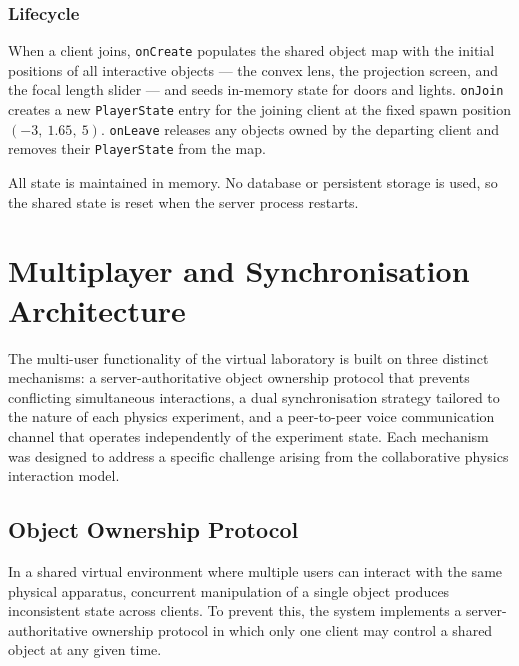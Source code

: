 \subsubsection{Lifecycle}

When a client joins, \texttt{onCreate} populates the shared object map
with the initial positions of all interactive objects --- the convex lens,
the projection screen, and the focal length slider --- and seeds in-memory
state for doors and lights. \texttt{onJoin} creates a new
\texttt{PlayerState} entry for the joining client at the fixed spawn
position $(-3,\ 1.65,\ 5)$. \texttt{onLeave} releases any objects owned
by the departing client and removes their \texttt{PlayerState} from the
map.

All state is maintained in memory. No database or persistent storage is
used, so the shared state is reset when the server process restarts.


\section{Multiplayer and Synchronisation Architecture}
\label{sec:multiplayer_architecture}

The multi-user functionality of the virtual laboratory is built on three
distinct mechanisms: a server-authoritative object ownership protocol that
prevents conflicting simultaneous interactions, a dual synchronisation
strategy tailored to the nature of each physics experiment, and a
peer-to-peer voice communication channel that operates independently of
the experiment state. Each mechanism was designed to address a specific
challenge arising from the collaborative physics interaction model.

\subsection{Object Ownership Protocol}
\label{sec:ownership_protocol}

In a shared virtual environment where multiple users can interact with
the same physical apparatus, concurrent manipulation of a single object
produces inconsistent state across clients. To prevent this, the system
implements a server-authoritative ownership protocol in which only one
client may control a shared object at any given time.

